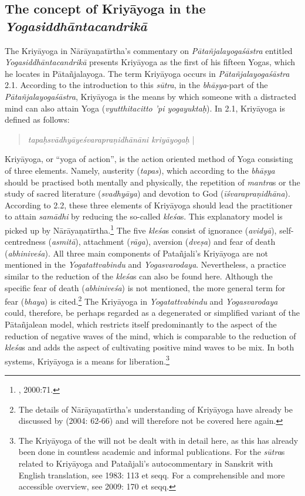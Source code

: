 \subsection{The concept of Kriyāyoga in the \textit{Yogasiddhāntacandrikā}}

The Kriyāyoga in Nārāyaṇatīrtha's commentary on \textit{Pātañjalayogaśāstra} entitled \textit{Yogasiddhāntacandrikā} presents Kriyāyoga as the first of his fifteen Yogas, which he locates in Pātañjalayoga. The term Kriyāyoga occurs in \textit{Pātañjalayogaśāstra} 2.1. According to the introduction to this \textit{sūtra}, in the \textit{bhāṣya}-part of the \textit{Pātañjalayogaśāstra}, Kriyāyoga is the means by which someone with a distracted mind can also attain Yoga (\textit{vyutthitacitto 'pi yogayuktaḥ}). In  2.1, Kriyāyoga is defined as follows:
\begin{quote}  
  \textit{tapaḥsvādhyāyeśvarapraṇidhānāni kriyāyogaḥ} |
\end{quote}

Kriyāyoga, or ``yoga of action'', is the action oriented method of Yoga consisting of three elements. Namely, austerity (\textit{tapas}), which according to the \textit{bhāṣya} should be practised both mentally and physically, the repetition of \textit{mantra}s or the study of sacred literature (\textit{svadhyāya}) and devotion to God (\textit{īśvarapraṇidhāna}).
According to  2.2, these three elements of Kriyāyoga should lead the practitioner to attain \textit{samādhi} by reducing the so-called \textit{kleśa}s. This explanatory model is picked up by Nārāyaṇatīrtha.\footnote{\citeauthor{yogacandrika}, 2000:71.} The five \textit{kleśa}s consist of ignorance (\textit{avidyā}), self-centredness (\textit{asmitā}), attachment (\textit{rāga}), aversion (\textit{dveṣa}) and fear of death (\textit{abhiniveśa}). 
All three main components of Patañjali's Kriyāyoga are not mentioned in the \textit{Yogatattvabindu} and \textit{Yogasvarodaya}. Nevertheless, a practice similar to the reduction of the \textit{kleśa}s can also be found here. Although the specific fear of death (\textit{abhiniveśa}) is not mentioned, the more general term for fear (\textit{bhaya}) is cited.\footnote{The details of Nārāyaṇatīrtha's understanding of Kriyāyoga have already be discussed by \citeauthor{penna2004} (2004: 62-66) and will therefore not be covered here again.}
The Kriyāyoga in \textit{Yogatattvabindu} and \textit{Yogasvarodaya} could, therefore, be perhaps regarded as a degenerated or simplified variant of the Pātañjalean model, which restricts itself predominantly to the aspect of the reduction of negative waves of the mind, which is comparable to the reduction of \textit{kleśa}s and adds the aspect of cultivating positive mind waves to be mix. In both systems, Kriyāyoga is a means for liberation.\footnote{The Kriyāyoga of the  will not be dealt with in detail here, as this has already been done in countless academic and informal publications. For the \textit{sūtra}s related to Kriyāyoga and Patañjali's autocommentary in Sanskrit with English translation, see \citeauthor{yogasutra} 1983: 113 et seqq. For a comprehensible and more accessible overview, see \citeauthor{bryant2009} 2009: 170 et seqq.}

